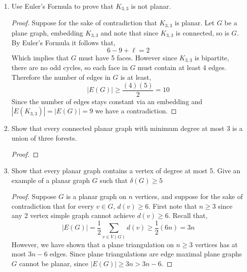 \documentclass[12pt]{article}
\begin{document}
\begin{enumerate}
	\item Use Euler's Formula to prove that $K_{3,3}$ is not planar. 
	\begin{proof} Suppose for the sake of contradiction that $K_{3, 3}$ is planar. Let $G$ be a plane graph, embedding $K_{3, 3}$ and note that since $K_{3,3}$ is connected, so is $G$. By Euler's Formula it follows that, 
		\begin{equation*}
			6 - 9 + \ell = 2
		\end{equation*}
		Which implies that $G$ must have 5 faces. However since $K_{3, 3}$ is bipartite, there are no odd cycles, so each face in $G$ must contain at least 4 edges. Therefore the number of edges in $G$ is at least, 
		\begin{equation*}
			|E(G)| \geq \dfrac{(4)(5)}{2} = 10
		\end{equation*}
		Since the number of edges stays constant via an embedding and $|E(K_{3, 3})| = |E(G)| = 9$ we have a contradiction. 
	\end{proof}
	\newpage


	\item Show that every connected planar graph with minimum degree at most 3 is a union of three forests.
	\begin{proof}
	\end{proof} 
	\newpage




	\item Show that every planar graph contains a vertex of degree at most 5. Give an example of a planar graph $G$ such that $\delta(G) \geq 5$
	\begin{proof} Suppose $G$ is a planar graph on $n$ vertices, and suppose for the sake of contradiction that for every $v \in G$, $d(v) \geq 6$. First note that $n \geq 3$ since any $2$ vertex simple graph cannot achieve $d(v) \geq 6$. Recall that,
		\begin{equation*}
			|E(G)| = \frac{1}{2} \sum_{v \in V(G)}d(v) \geq \frac{1}{2}(6n) = 3n
		\end{equation*}
		However, we have shown that a plane triangulation on $n \geq 3$ vertices has at most $3n - 6$ edges. Since plane triangulations are edge maximal plane graphs $G$ cannot be planar, since $|E(G)| \geq 3n > 3n - 6$. 
	\end{proof}


\end{enumerate}
\end{document}
